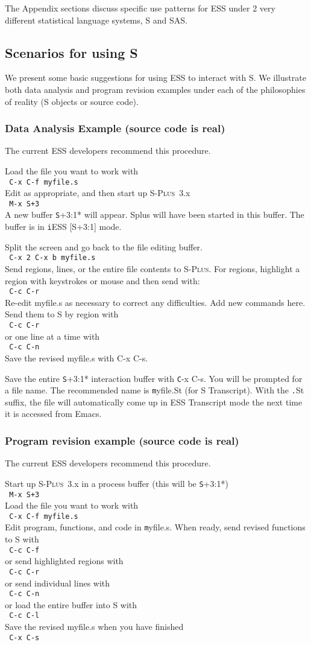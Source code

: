 \documentclass{article}
\newcommand*{\Splus}{\textsc{S-Plus}}
\newcommand{\elcode}[1]{\\{\texttt{\hspace*{2em} #1}}\\}
\begin{document}
The Appendix sections discuss specific use patterns for ESS under 2 very
different statistical language systems, S and SAS.

\subsection{Scenarios for using S}
\label{sec:S:scenarios}

We present some basic suggestions for using ESS to interact with S.
We illustrate both data analysis and program revision examples under each of
the philosophies of reality (S objects or source code).

\subsubsection{Data Analysis Example (source code is real)}
The current ESS developers recommend this procedure.

\noindent
Load the file you want to work with
  \elcode{C-x C-f myfile.s}
Edit as appropriate, and then start up \Splus~3.x
  \elcode{M-x S+3}
A new buffer {\texttt *S+3:1*} will appear.  Splus will have been started
in this buffer.  The buffer is in {\texttt iESS [S+3:1]} mode.

Split the screen and go back to the file editing buffer.
  \elcode{C-x 2 C-x b myfile.s}
Send regions, lines, or the entire file contents to \Splus.
For regions, highlight a region with keystrokes or mouse
and then send with:
  \elcode{C-c C-r}
Re-edit myfile.s as necessary to correct any difficulties.  Add
new commands here.  Send them to S by region with
  \elcode{C-c C-r}
or one line at a time with
  \elcode{C-c C-n}
Save the revised myfile.s with C-x C-s.

Save the entire {\texttt *S+3:1*} interaction buffer with {\texttt C-x C-s}.  You
will be prompted for a file name.  The recommended name is
{\texttt myfile.St} (for S Transcript).  With the {\texttt *.St} suffix,
the file will automatically come up in ESS
Transcript mode the next time it is accessed from Emacs.


\subsubsection{Program revision example (source code is real)}
The current ESS developers recommend this procedure.

\noindent
Start up \Splus~3.x in a process buffer (this will be {\texttt *S+3:1*})
  \elcode{M-x S+3}
Load the file you want to work with
  \elcode{C-x C-f myfile.s}
Edit program, functions, and code in {\texttt myfile.s}.
When ready, send revised functions to S with
  \elcode{C-c C-f}
or send highlighted regions with
  \elcode{C-c C-r}
or send individual lines with
  \elcode{C-c C-n}
or load the entire buffer into S with
  \elcode{C-c C-l}
Save the revised myfile.s when you have finished
  \elcode{C-x C-s}
\end{document}
